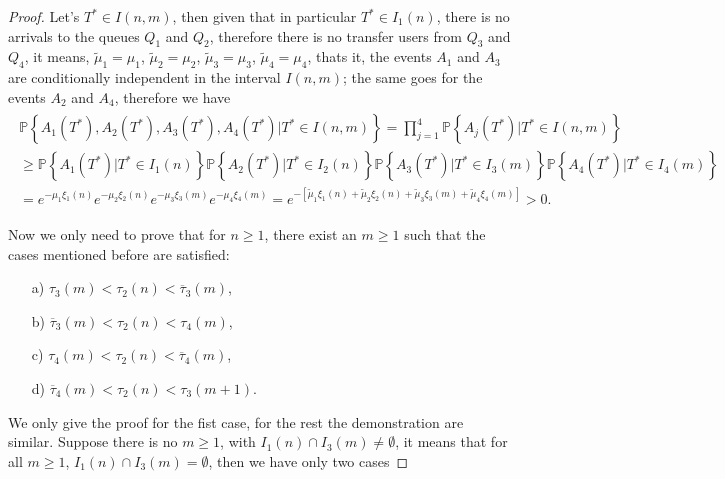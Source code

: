 \documentclass{article}
\newcommand{\prob}{\mathbb{P}}
\begin{document}
\begin{proof}
Let's $T^{*}\in I\left(n,m\right)$, then given that in particular $T^{*}\in I_{1}\left(n\right)$, there is no arrivals to the queues $Q_{1}$ and $Q_{2}$, therefore there is no transfer users from $Q_{3}$ and $Q_{4}$, it means, $\tilde{\mu}_{1}=\mu_{1}$, $\tilde{\mu}_{2}=\mu_{2}$, $\tilde{\mu}_{3}=\mu_{3}$, $\tilde{\mu}_{4}=\mu_{4}$, thats it, the events $A_{1}$ and $A_{3}$ are conditionally independent in the interval $I\left(n,m\right)$; the same goes for the events $A_{2}$ and $A_{4}$, therefore we have
\begin{eqnarray}
\begin{array}{l}
\prob\left\{A_{1}\left(T^{*}\right),A_{2}\left(T^{*}\right),
A_{3}\left(T^{*}\right),A_{4}\left(T^{*}\right)|T^{*}\in I\left(n,m\right)\right\}
=\prod_{j=1}^{4}\prob\left\{A_{j}\left(T^{*}\right)|T^{*}\in I\left(n,m\right)\right\}\\
\geq\prob\left\{A_{1}\left(T^{*}\right)|T^{*}\in I_{1}\left(n\right)\right\}
\prob\left\{A_{2}\left(T^{*}\right)|T^{*}\in I_{2}\left(n\right)\right\}
\prob\left\{A_{3}\left(T^{*}\right)|T^{*}\in I_{3}\left(m\right)\right\}
\prob\left\{A_{4}\left(T^{*}\right)|T^{*}\in I_{4}\left(m\right)\right\}\\
=e^{-\mu_{1}\xi_{1}\left(n\right)}
e^{-\mu_{2}\xi_{2}\left(n\right)}
e^{-\mu_{3}\xi_{3}\left(m\right)}
e^{-\mu_{4}\xi_{4}\left(m\right)}
=e^{-\left[\tilde{\mu}_{1}\xi_{1}\left(n\right)
+\tilde{\mu}_{2}\xi_{2}\left(n\right)
+\tilde{\mu}_{3}\xi_{3}\left(m\right)
+\tilde{\mu}_{4}\xi_{4}
\left(m\right)\right]}>0.
\end{array}
\end{eqnarray}

Now we only need to prove that for $n\ge1$, there exist an $m\geq1$ such that the cases mentioned before are satisfied: 

\begin{multicols}{2}
\begin{itemize}
\item[a)] $\tau_{3}\left(m\right)<\tau_{2}\left(n\right)<\overline{\tau}_{3}\left(m\right)$,

\item[b)] $\overline{\tau}_{3}\left(m\right)<\tau_{2}\left(n\right)
<\tau_{4}\left(m\right)$,

\item[c)] $\tau_{4}\left(m\right)<\tau_{2}\left(n\right)<
\overline{\tau}_{4}\left(m\right)$,

\item[d)] $\overline{\tau}_{4}\left(m\right)<\tau_{2}\left(n\right)
<\tau_{3}\left(m+1\right)$.
\end{itemize}
\end{multicols}
We only give the proof for the fist case, for the rest the demonstration are similar. Suppose there is no $m\geq1$, with $I_{1}\left(n\right)\cap I_{3}\left(m\right)\neq\emptyset$, it means that for all $m\geq1$, $I_{1}\left(n\right)\cap I_{3}\left(m\right)=\emptyset$, then we have only two cases


\end{proof}
\end{document}
